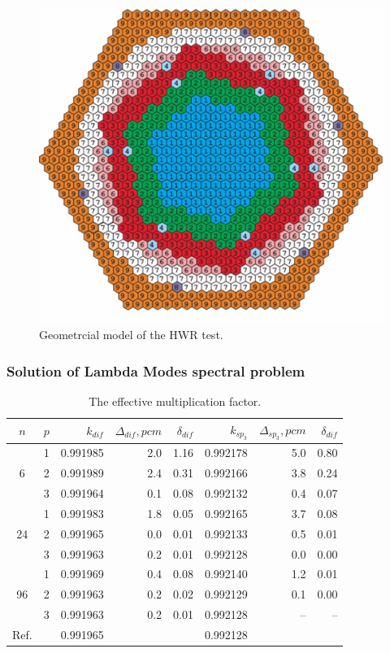 \documentclass[authoryear]{elsarticle}
\begin{document}
\begin{figure}[h]
	\begin{center}
    		\includegraphics[width=0.9\linewidth] {hwr.png}
		\caption{Geometrcial model of the HWR test.}
		\label{fig:hwr}
	\end{center}
\end{figure} 

\subsubsection{Solution of Lambda Modes spectral problem}
\begin{table}[H]
\caption{The effective multiplication factor.}
\label{tab:hwr_lambda}
\begin{center}
\begin{tabular}{c c r r r r r r}
\hline
$n$ & $p$ & $k_{dif}$ & $\Delta_{dif},pcm$ & $\delta_{dif}$ &$k_{sp_3}$& $\Delta_{sp_3},pcm$ & $\delta_{dif}$ \\
\hline
	& 1	& 0.991985&  2.0& 1.16&0.992178&   5.0& 0.80\\
6	& 2	& 0.991989&  2.4& 0.31&0.992166&   3.8& 0.24\\
	& 3	& 0.991964&  0.1& 0.08&0.992132&   0.4& 0.07\\
\hline
	& 1	& 0.991983&  1.8& 0.05&0.992165&   3.7& 0.08\\
24& 2	& 0.991965&  0.0& 0.01&0.992133&   0.5& 0.01\\
	& 3	& 0.991963&  0.2& 0.01&0.992128&   0.0& 0.00\\ 
\hline
	& 1	& 0.991969&  0.4& 0.08&0.992140&   1.2& 0.01\\
96& 2	& 0.991963&  0.2& 0.02&0.992129&   0.1& 0.00\\
	& 3	& 0.991963&  0.2& 0.01&0.992128&    --& --\\ 
\hline
Ref.&   & 0.991965&    & & 0.992128 & & \\ 
\hline
\end{tabular}
\end{center}
\end{table}
\end{document}
